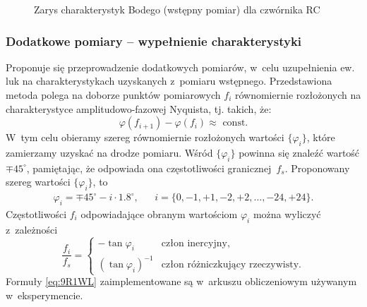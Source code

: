 \documentclass[paper=a4,DIV=12]{lpas}
\newcommand{\degree}{^{\circ}}
\begin{document}
\begin{appendices}
  \begin{figure}[H]
    \centering
    
    \caption{Zarys charakterystyk Bodego (wstępny pomiar) dla czwórnika RC}
    \label{fig:UIR99}
  \end{figure}

  \subsubsection{Dodatkowe pomiary -- wypełnienie charakterystyki}
  \label{sec:2C7WK}

  Proponuje się przeprowadzenie dodatkowych pomiarów, w~celu uzupełnienia ew. luk
  na charakterystykach uzyskanych z~pomiaru wstępnego. Przedstawiona metoda
  polega na doborze punktów pomiarowych $f_i$ równomiernie rozłożonych na
  charakterystyce amplitudowo-fazowej Nyquista, tj. takich, że:
  \begin{equation}
    \varphi(f_{i+1}) - \varphi(f_i) \approx \text{ const}.
    \label{eq:BMOQL}
  \end{equation}
  W~tym celu obieramy szereg równomiernie rozłożonych wartości $\{\varphi_i\}$,
  które zamierzamy uzyskać na drodze pomiaru. Wśród $\{\varphi_i\}$ powinna się
  znaleźć wartość $\mp 45\degree$, pamiętając, że odpowiada ona
  częstotliwości granicznej~$f_s$. Proponowany szereg wartości $\{\varphi_i\}$, to
  \begin{equation}
    \begin{aligned}
      & \varphi_i = \mp 45\degree - i \cdot 1.8\degree, && i=\{0, -1,+1,-2,+2,\dots,-24,+24\}. &
    \end{aligned}
    \label{eq:0ZBDF}
  \end{equation}
  Częstotliwości $f_i$ odpowiadające obranym wartościom $\varphi_i$ można wyliczyć
  z~zależności
  \begin{equation}
    \frac{f_i}{f_s} = \begin{cases}
      - \tan{\varphi_i} & \text{człon inercyjny}, \\
      (\tan{\varphi_i})^{-1} & \text{człon różniczkujący rzeczywisty}.
    \end{cases}
    \label{eq:9R1WL}
  \end{equation}
  Formuły \eqref{eq:9R1WL} zaimplementowane są w~arkuszu obliczeniowym używanym
  w~eksperymencie.


\end{appendices}
\end{document}
